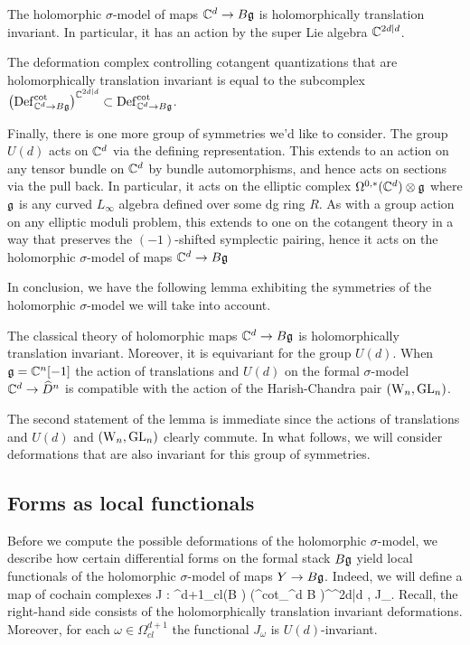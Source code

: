 \begin{lem}
The holomorphic $\sigma$-model of maps $\mathbb C^d \to B \mathfrak g$ is holomorphically translation invariant. 
In particular, it has an action by the super Lie algebra $\mathbb C^{2d|d}$. 
\end{lem}

The deformation complex controlling cotangent quantizations that are holomorphically translation invariant is equal to the subcomplex $\left({\rm Def}_{\mathbb C^d \to B \mathfrak g}^{\rm cot}\right)^{\mathbb C^{2d|d}} \subset {\rm Def}^{\rm cot}_{\mathbb C^d \to B \mathfrak g}$. 

Finally, there is one more group of symmetries we'd like to consider.
The group $U(d)$ acts on $\mathbb C^d$ via the defining representation.
This extends to an action on any tensor bundle on $\mathbb C^d$ by bundle automorphisms, and hence acts on sections via the pull back. 
In particular, it acts on the elliptic complex $\Omega^{0,*}(\mathbb C^d) \otimes \mathfrak g$ where $\mathfrak g$ is any curved $L_\infty$ algebra defined over some dg ring $R$. 
As with a group action on any elliptic moduli problem, this extends to one on the cotangent theory in a way that preserves the $(-1)$-shifted symplectic pairing, hence it acts on the holomorphic $\sigma$-model of maps $\mathbb C^d \to B \mathfrak g$

In conclusion, we have the following lemma exhibiting the symmetries of the holomorphic $\sigma$-model we will take into account.

\begin{lem}
The classical theory of holomorphic maps $\mathbb C^d \to B \mathfrak g$ is holomorphically translation invariant. 
Moreover, it is equivariant for the group $U(d)$. 
When $\mathfrak g = \mathbb C^n[-1]$ the action of translations and $U(d)$ on the formal $\sigma$-model $\mathbb C^d \to \widehat{D}^n$ is compatible with the action of the Harish-Chandra pair $({{\rm W}_n}, {\rm GL}_n)$. 
\end{lem}

The second statement of the lemma is immediate since the actions of translations and $U(d)$ and $({{\rm W}_n}, {\rm GL}_n)$ clearly commute.
In what follows, we will consider deformations that are also invariant for this group of symmetries. 

\subsection{Forms as local functionals} \label{sec: forms to local}

Before we compute the possible deformations of the holomorphic $\sigma$-model, we describe how certain differential forms on the formal stack $B \mathfrak g$ yield local functionals of the holomorphic $\sigma$-model of maps $Y \to B \mathfrak g$. 
Indeed, we will define a map of cochain complexes
\ben
J : \Omega^{d+1}_{cl}(B \fg) \to \left(\Def^{\rm cot}_{\CC^d \to B \fg}\right)^{\CC^{2d|d}} \;\;  , \;\; \omega \mapsto J_\omega .
\een
Recall, the right-hand side consists of the holomorphically translation invariant deformations.
Moreover, for each $\omega \in \Omega^{d+1}_{cl}$ the functional $J_\omega$ is $U(d)$-invariant. 

